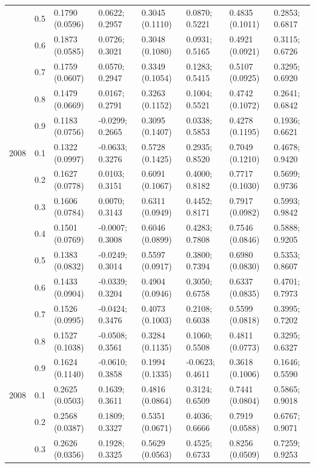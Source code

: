 \begin{table}
{\begin{tabular}[t]{llllllll}
 & 0.5 & 0.1790 (0.0596) & 0.0622; 0.2957 & 0.3045 (0.1110) & 0.0870; 0.5221 & 0.4835 (0.1011) & 0.2853; 0.6817\\
 & 0.6 & 0.1873 (0.0585) & 0.0726; 0.3021 & 0.3048 (0.1080) & 0.0931; 0.5165 & 0.4921 (0.0921) & 0.3115; 0.6726\\
 & 0.7 & 0.1759 (0.0607) & 0.0570; 0.2947 & 0.3349 (0.1054) & 0.1283; 0.5415 & 0.5107 (0.0925) & 0.3295; 0.6920\\
 & 0.8 & 0.1479 (0.0669) & 0.0167; 0.2791 & 0.3263 (0.1152) & 0.1004; 0.5521 & 0.4742 (0.1072) & 0.2641; 0.6842\\
 & 0.9 & 0.1183 (0.0756) & -0.0299; 0.2665 & 0.3095 (0.1407) & 0.0338; 0.5853 & 0.4278 (0.1195) & 0.1936; 0.6621\\
2008 & 0.1 & 0.1322 (0.0997) & -0.0633; 0.3276 & 0.5728 (0.1425) & 0.2935; 0.8520 & 0.7049 (0.1210) & 0.4678; 0.9420\\
 & 0.2 & 0.1627 (0.0778) & 0.0103; 0.3151 & 0.6091 (0.1067) & 0.4000; 0.8182 & 0.7717 (0.1030) & 0.5699; 0.9736\\
 & 0.3 & 0.1606 (0.0784) & 0.0070; 0.3143 & 0.6311 (0.0949) & 0.4452; 0.8171 & 0.7917 (0.0982) & 0.5993; 0.9842\\
 & 0.4 & 0.1501 (0.0769) & -0.0007; 0.3008 & 0.6046 (0.0899) & 0.4283; 0.7808 & 0.7546 (0.0846) & 0.5888; 0.9205\\
 & 0.5 & 0.1383 (0.0832) & -0.0249; 0.3014 & 0.5597 (0.0917) & 0.3800; 0.7394 & 0.6980 (0.0830) & 0.5353; 0.8607\\
 & 0.6 & 0.1433 (0.0904) & -0.0339; 0.3204 & 0.4904 (0.0946) & 0.3050; 0.6758 & 0.6337 (0.0835) & 0.4701; 0.7973\\
 & 0.7 & 0.1526 (0.0995) & -0.0424; 0.3476 & 0.4073 (0.1003) & 0.2108; 0.6038 & 0.5599 (0.0818) & 0.3995; 0.7202\\
 & 0.8 & 0.1527 (0.1038) & -0.0508; 0.3561 & 0.3284 (0.1135) & 0.1060; 0.5508 & 0.4811 (0.0773) & 0.3295; 0.6327\\
 & 0.9 & 0.1624 (0.1140) & -0.0610; 0.3858 & 0.1994 (0.1335) & -0.0623; 0.4611 & 0.3618 (0.1006) & 0.1646; 0.5590\\
2008 & 0.1 & 0.2625 (0.0503) & 0.1639; 0.3611 & 0.4816 (0.0864) & 0.3124; 0.6509 & 0.7441 (0.0804) & 0.5865; 0.9018\\
 & 0.2 & 0.2568 (0.0387) & 0.1809; 0.3327 & 0.5351 (0.0671) & 0.4036; 0.6666 & 0.7919 (0.0588) & 0.6767; 0.9071\\
 & 0.3 & 0.2626 (0.0356) & 0.1928; 0.3325 & 0.5629 (0.0563) & 0.4525; 0.6733 & 0.8256 (0.0509) & 0.7259; 0.9253\\

\end{tabular}}
\end{table}
